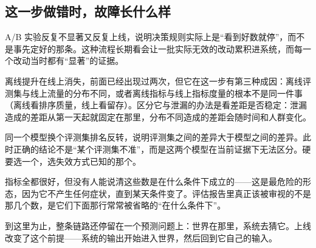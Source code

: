 \subsection{这一步做错时，故障长什么样}

A/B 实验反复不显著又反复上线，说明决策规则实际上是``看到好数就停''，而不是事先定好的那条。这种流程长期看会让一批实际无效的改动累积进系统，而每一个改动当时都有``显著''的证据。

离线提升在线上消失，前面已经出现过两次，但它在这一步有第三种成因：离线评测集与线上流量的分布不同，或者离线指标与线上指标度量的根本不是同一件事（离线看排序质量，线上看留存）。区分它与泄漏的办法是看差距是否稳定：泄漏造成的差距从第一天起就固定在那里，分布不同造成的差距会随时间和人群变化。

同一个模型换个评测集排名反转，说明评测集之间的差异大于模型之间的差异。此时正确的结论不是``某个评测集不准''，而是这两个模型在当前证据下无法区分。硬要选一个，选失效方式已知的那个。

指标全都很好，但没有人能说清这些数是在什么条件下成立的——这是最危险的形态，因为它不产生任何症状，直到某天条件变了。评估报告里真正该被审视的不是那几个数，是它们下面那行常常被省略的``在什么条件下''。

到这里为止，整条链路还停留在一个预测问题上：世界在那里，系统去猜它。上线改变了这个前提——系统的输出开始进入世界，然后回到它自己的输入。
